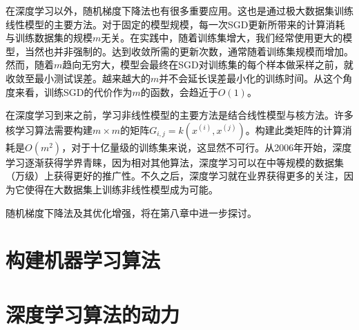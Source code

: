 在深度学习以外，随机梯度下降法也有很多重要应用。这也是通过极大数据集训练线性模型的主要方法。对于固定的模型规模，每一次SGD更新所带来的计算消耗与训练数据集的规模$m$无关。在实践中，随着训练集增大，我们经常使用更大的模型，当然也并非强制的。达到收敛所需的更新次数，通常随着训练集规模而增加。然而，随着$m$趋向无穷大，模型会最终在SGD对训练集的每个样本做采样之前，就收敛至最小测试误差。越来越大的$m$并不会延长误差最小化的训练时间。从这个角度来看，训练SGD的代价作为$m$的函数，会趋近于$O(1)$。

在深度学习到来之前，学习非线性模型的主要方法是结合线性模型与核方法。许多核学习算法需要构建$m \times m$的矩阵$G_{i,j}=k(x^{(i)}, x^{(j)})$。构建此类矩阵的计算消耗是$O(m^2)$，对于十亿量级的训练集来说，这显然不可行。从2006年开始，深度学习逐渐获得学界青睐，因为相对其他算法，深度学习可以在中等规模的数据集（万级）上获得更好的推广性。不久之后，深度学习就在业界获得更多的关注，因为它使得在大数据集上训练非线性模型成为可能。

随机梯度下降法及其优化增强，将在第八章中进一步探讨。

\section{构建机器学习算法}
\label{sec:5.10}

\section{深度学习算法的动力}
\label{sec:5.11}
